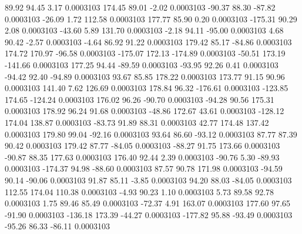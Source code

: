        89.92       94.45        3.17     0.0003103
      174.45       89.01       -2.02     0.0003103
      -90.37       88.30      -87.82     0.0003103
      -26.09        1.72      112.58     0.0003103
      177.77       85.90        0.20     0.0003103
     -175.31       90.29        2.08     0.0003103
      -43.60        5.89      131.70     0.0003103
       -2.18       94.11      -95.00     0.0003103
        4.68       90.42       -2.57     0.0003103
       -4.64       86.92       91.22     0.0003103
      179.42       85.17      -84.86     0.0003103
      174.72      170.97      -96.58     0.0003103
     -175.07      172.13     -174.89     0.0003103
      -50.51      173.19     -141.66     0.0003103
      177.25       94.44      -89.59     0.0003103
      -93.95       92.26        0.41     0.0003103
      -94.42       92.40      -94.89     0.0003103
       93.67       85.85      178.22     0.0003103
      173.77       91.15       90.96     0.0003103
      141.40        7.62      126.69     0.0003103
      178.84       96.32     -176.61     0.0003103
     -123.85      174.65     -124.24     0.0003103
      176.02       96.26      -90.70     0.0003103
      -94.28       90.56      175.31     0.0003103
      178.92       96.24       91.68     0.0003103
      -48.86      172.67       43.61     0.0003103
     -128.12      174.04      138.87     0.0003103
      -83.73       91.89       88.31     0.0003103
       42.77      174.48      137.42     0.0003103
      179.80       99.04      -92.16     0.0003103
       93.64       86.60      -93.12     0.0003103
       87.77       87.39       90.42     0.0003103
      179.42       87.77      -84.05     0.0003103
      -88.27       91.75      173.66     0.0003103
      -90.87       88.35      177.63     0.0003103
      176.40       92.44        2.39     0.0003103
      -90.76        5.30      -89.93     0.0003103
     -174.37       94.98      -88.60     0.0003103
       87.57       90.78      171.98     0.0003103
      -94.59       90.14      -90.06     0.0003103
       91.87       85.11       -3.85     0.0003103
       94.20       88.03      -84.05     0.0003103
      112.55      174.04      110.38     0.0003103
       -4.93       90.23        1.10     0.0003103
        5.73       89.58       92.78     0.0003103
        1.75       89.46       85.49     0.0003103
      -72.37        4.91      163.07     0.0003103
      177.60       97.65      -91.90     0.0003103
     -136.18      173.39      -44.27     0.0003103
     -177.82       95.88      -93.49     0.0003103
      -95.26       86.33      -86.11     0.0003103
